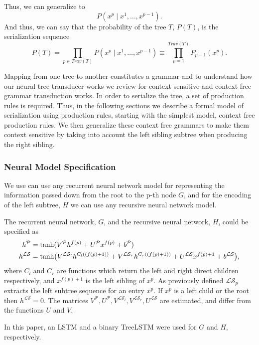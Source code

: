\documentclass{article}
\begin{document}
Thus, we can generalize to
\[
P(x^p \mid x^{1}, \ldots,x^{p-1}).
\]
And thus, we can say that the probability of the tree $T$, $P(T)$,  is the serialization sequence
\[
P(T) = \prod_{p \in Trav(T)}{P(x^p \mid x^{1}, \ldots, x^{p-1})} \equiv \prod_{p = 1}^{Trav(T)} P_{p-1}(x^p).
\]

Mapping from one tree to another constitutes a grammar and to understand how our neural tree transducer works we review for context sensitive and context free grammar transduction works.
%
In order to serialize the tree, a set of production rules is required. Thus, in the following sections we describe a formal model of serialization using production rules, starting with the simplest model, context free production rules. We then generalize these context free grammars to make them context sensitive by taking into account the left sibling subtree when producing the right sibling.

\subsubsection{Neural Model Specification}

We use can use any recurrent neural network model for representing the information passed down from the root to the p-th node $G$, and for the encoding of the left subtree, $H$ we can use any recursive neural network model. 

The recurrent neural network, $G$, and the recursive neural network, $H$, could be specified as 
\begin{align*}
    h^{\mathcal{P}} &= \hbox{tanh}(V^{\mathcal{P}}h^{f(p)} + U^{\mathcal{P}} x^{f(p)} + b^{\mathcal{P}}) \\
    h^{\mathcal{LS}} &= \hbox{tanh}\big(V^{\mathcal{LS}_l}h^{C_l((f(p)+1))} + V^{\mathcal{LS}_r}h^{C_r((f(p)+1))}  +   U^{\mathcal{LS}} x^{f(p)+1} + b^{\mathcal{LS}}\big),
\end{align*}
where $C_l$ and $C_r$ are functions which return the left and right direct children respectively, and $x^{f(p)+1}$ is the left sibling of $x^p$. As previously defined  $\mathcal{LS}_p$ extracts the left subtree sequence for an entry $x^p$. If $x^p$ is a left child or the root then $h^{\mathcal{LS}} = 0$. The matrices $V^{\mathcal{P}}, U^{\mathcal{P}}, V^{\mathcal{LS}_l}, V^{\mathcal{LS}_r}, U^{\mathcal{LS}}$ are estimated, and differ from the functions $U$ and $V$. 

In this paper, an LSTM and a binary TreeLSTM were used for $G$ and $H$, respectively. %
\end{document}
